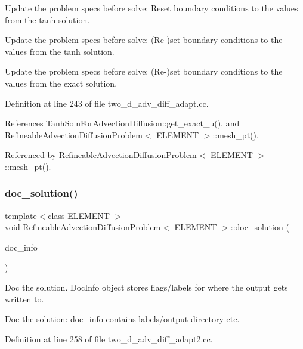 Update the problem specs before solve\+: Reset boundary conditions to the values from the tanh solution. 

Update the problem specs before solve\+: (Re-\/)set boundary conditions to the values from the tanh solution.

Update the problem specs before solve\+: (Re-\/)set boundary conditions to the values from the exact solution. 

Definition at line 243 of file two\+\_\+d\+\_\+adv\+\_\+diff\+\_\+adapt.\+cc.



References Tanh\+Soln\+For\+Advection\+Diffusion\+::get\+\_\+exact\+\_\+u(), and Refineable\+Advection\+Diffusion\+Problem$<$ E\+L\+E\+M\+E\+N\+T $>$\+::mesh\+\_\+pt().



Referenced by Refineable\+Advection\+Diffusion\+Problem$<$ E\+L\+E\+M\+E\+N\+T $>$\+::mesh\+\_\+pt().

\mbox{\label{classRefineableAdvectionDiffusionProblem_a50af5d1ac7092f299967c962b15c5a0c}} 
\subsubsection{\texorpdfstring{doc\+\_\+solution()}{doc\_solution()}\hspace{0.1cm}{\footnotesize\ttfamily [1/2]}}
{\footnotesize\ttfamily template$<$class E\+L\+E\+M\+E\+NT $>$ \\
void \hyperlink{classRefineableAdvectionDiffusionProblem}{Refineable\+Advection\+Diffusion\+Problem}$<$ E\+L\+E\+M\+E\+NT $>$\+::doc\+\_\+solution (\begin{DoxyParamCaption}\item[{Doc\+Info \&}]{doc\+\_\+info }\end{DoxyParamCaption})}



Doc the solution. Doc\+Info object stores flags/labels for where the output gets written to. 

Doc the solution\+: doc\+\_\+info contains labels/output directory etc. 

Definition at line 258 of file two\+\_\+d\+\_\+adv\+\_\+diff\+\_\+adapt2.\+cc.


